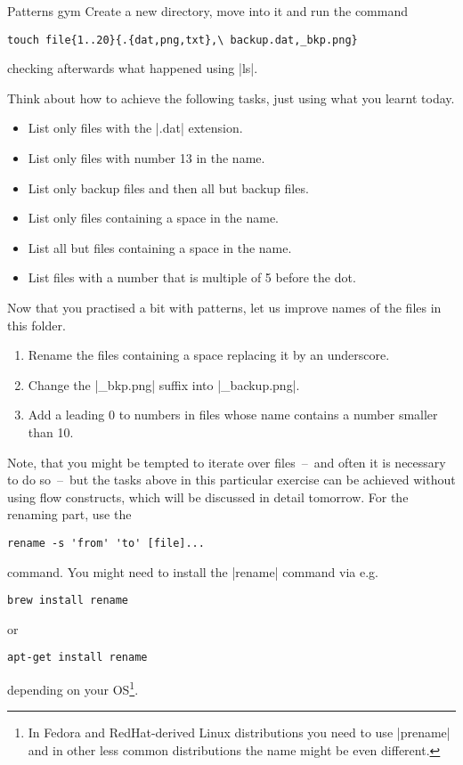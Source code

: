 
\begin{exercise}[Inspirational]{Patterns gym}
    Create a new directory, move into it and run the command
    \begin{lstlisting}[style=MyBash]
        touch file{1..20}{.{dat,png,txt},\ backup.dat,_bkp.png}
    \end{lstlisting}
    checking afterwards what happened using \bash|ls|.

    Think about how to achieve the following tasks, just using what you learnt today.
    \begin{itemize}
        \item List only files with the \bash|.dat| extension.
        \item List only files with number 13 in the name.
        \item List only backup files and then all but backup files.
        \item List only files containing a space in the name.
        \item List all but files containing a space in the name.
        \item List files with a number that is multiple of 5 before the dot.
    \end{itemize}

    Now that you practised a bit with patterns, let us improve names of the files in this folder.
    \begin{enumerate}
        \item Rename the files containing a space replacing it by an underscore.
        \item Change the \bash|_bkp.png| suffix into \bash|_backup.png|.
        \item Add a leading 0 to numbers in files whose name contains a number smaller than 10.
    \end{enumerate}

    Note, that you might be tempted to iterate over files~--~and often it is necessary to do so~--~but the tasks above in this particular exercise can be achieved without using flow constructs, which will be discussed in detail tomorrow.
    For the renaming part, use the
    \begin{lstlisting}[style=MyBash]
        rename -s 'from' 'to' [file]...
    \end{lstlisting}
    command.
    You might need to install the \bash|rename| command via e.g.
    \begin{lstlisting}[style=MyBash, emph={[6]{brew}}]
        brew install rename
    \end{lstlisting}
    or
    \begin{lstlisting}[style=MyBash, emph={[6]{apt-get}}, alsoletter={-}]
        apt-get install rename
    \end{lstlisting}
    depending on your OS\footnote{In Fedora and RedHat-derived Linux distributions you need to use \bash|prename| and in other less common distributions the name might be even different.}.


\end{exercise}
